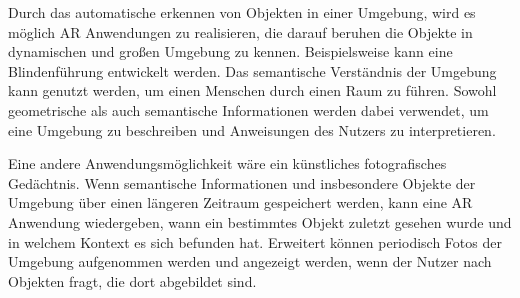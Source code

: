 Durch das automatische erkennen von Objekten in einer Umgebung, wird es möglich AR Anwendungen zu realisieren, die darauf beruhen die Objekte in dynamischen und großen Umgebung zu kennen. Beispielsweise kann eine Blindenführung entwickelt werden. Das semantische Verständnis der Umgebung kann genutzt werden, um einen Menschen durch einen Raum zu führen. Sowohl geometrische als auch semantische Informationen werden dabei verwendet, um eine Umgebung zu beschreiben und Anweisungen des Nutzers zu interpretieren.

Eine andere Anwendungsmöglichkeit wäre ein künstliches fotografisches Gedächtnis. Wenn semantische Informationen und insbesondere Objekte der Umgebung über einen längeren Zeitraum gespeichert werden, kann eine AR Anwendung wiedergeben, wann ein bestimmtes Objekt zuletzt gesehen wurde und in welchem Kontext es sich befunden hat. Erweitert können periodisch Fotos der Umgebung aufgenommen werden und angezeigt werden, wenn der Nutzer nach Objekten fragt, die dort abgebildet sind.
